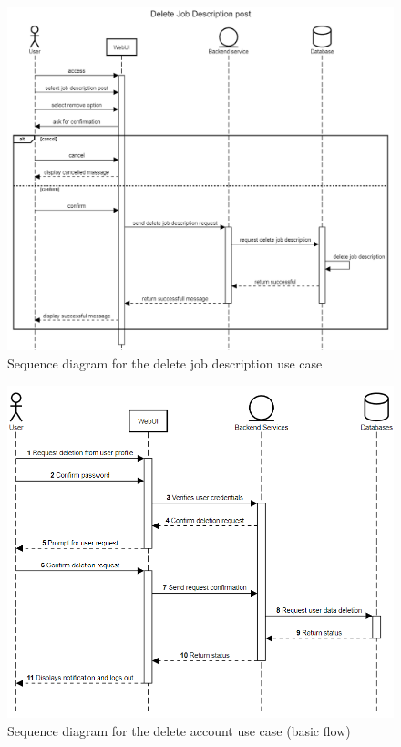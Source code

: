 \documentclass[a4paper]{article}
\begin{document}
    \begin{figure}[ht]
        \centering
        \includegraphics[width=1.0\textwidth]{Delete job description post.png}
        \caption{Sequence diagram for the delete job description use case}
        \label{fig:fig16}
    \end{figure}

    \begin{figure}[ht]
        \centering
        \includegraphics[width=1.0\textwidth]{delete_account.png}
        \caption{Sequence diagram for the delete account use case (basic flow)}
        \label{fig:fig17}
    \end{figure}
\end{document}
